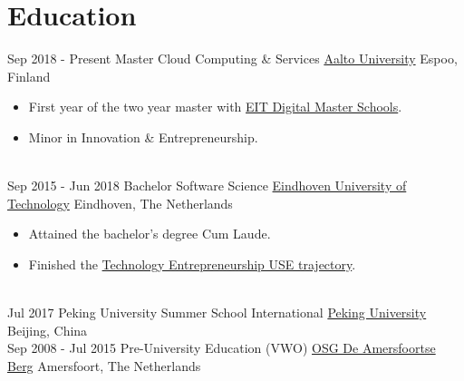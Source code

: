 \documentclass[letterpaper]{twentysecondcv} %
\begin{document}
\makeprofile %

\section{Education}

\begin{twenty} %
	\twentyitem
    	{Sep 2018 - }
        {Present}
        {Master Cloud Computing \& Services}
        {\href{https://aalto.fi/}{Aalto University}}
        {Espoo, Finland}
        {
        \begin{itemize}
            \item First year of the two year master with \href{https://masterschool.eitdigital.eu}{EIT Digital Master Schools}.
            \item Minor in Innovation \& Entrepreneurship.
        \end{itemize}
        }
    \\
    \twentyitem
    	{Sep 2015 - }
        {Jun 2018}
        {Bachelor Software Science}
        {\href{https://tue.nl/}{Eindhoven University of Technology}}
        {Eindhoven, The Netherlands}
        {
       	\begin{itemize}
   			\item Attained the bachelor's degree Cum Laude.
            \item Finished the \href{https://web.archive.org/web/20181111084550/https://educationguide.tue.nl/programs/bachelor-college/use-learning-trajectory/technology-entrepreneurship/}{Technology Entrepreneurship USE trajectory}.
		\end{itemize}
    	}
    \\
	\twentyitem
    	{Jul 2017}
		{}
        {Peking University Summer School International}
        {\href{http://www.oir.pku.edu.cn/summerschool/}{Peking University}}
        {Beijing, China}
        {
    	}
    \\
    \twentyitem
	    {Sep 2008 -}
	    {Jul 2015}
	    {Pre-University Education (VWO)}
	    {\href{http://www.amersfoortseberg.nl/}{OSG De Amersfoortse Berg}}
	    {Amersfoort, The Netherlands}
	    {
	    }
\end{twenty}
\end{document}
